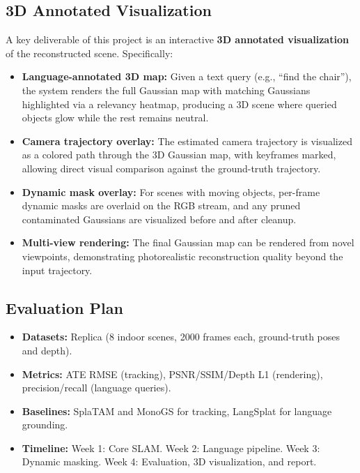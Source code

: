 \documentclass[10pt,twocolumn,letterpaper]{article}
\begin{document}
\subsection{3D Annotated Visualization}

A key deliverable of this project is an interactive \textbf{3D annotated visualization} of the reconstructed scene. Specifically:
\begin{itemize}
    \item \textbf{Language-annotated 3D map:} Given a text query (e.g., ``find the chair''), the system renders the full Gaussian map with matching Gaussians highlighted via a relevancy heatmap, producing a 3D scene where queried objects glow while the rest remains neutral.
    \item \textbf{Camera trajectory overlay:} The estimated camera trajectory is visualized as a colored path through the 3D Gaussian map, with keyframes marked, allowing direct visual comparison against the ground-truth trajectory.
    \item \textbf{Dynamic mask overlay:} For scenes with moving objects, per-frame dynamic masks are overlaid on the RGB stream, and any pruned contaminated Gaussians are visualized before and after cleanup.
    \item \textbf{Multi-view rendering:} The final Gaussian map can be rendered from novel viewpoints, demonstrating photorealistic reconstruction quality beyond the input trajectory.
\end{itemize}

\subsection{Evaluation Plan}

\begin{itemize}
    \item \textbf{Datasets:} Replica (8 indoor scenes, 2000 frames each, ground-truth poses and depth).
    \item \textbf{Metrics:} ATE RMSE (tracking), PSNR/SSIM/Depth L1 (rendering), precision/recall (language queries).
    \item \textbf{Baselines:} SplaTAM \cite{keetha2024splatam} and MonoGS \cite{matsuki2024monogs} for tracking, LangSplat \cite{qin2024langsplat} for language grounding.
    \item \textbf{Timeline:} Week 1: Core SLAM. Week 2: Language pipeline. Week 3: Dynamic masking. Week 4: Evaluation, 3D visualization, and report.
\end{itemize}
\end{document}
